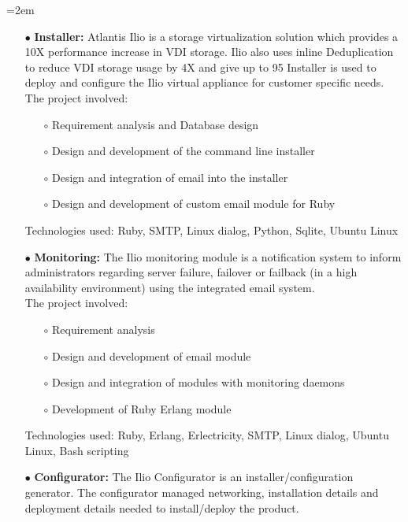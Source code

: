 \documentclass{scrartcl}
\newcommand{\MarginDate}[1]{\marginpar{\raggedleft\itshape\small#1}}
\newcommand{\Description}[1]{\hangindent=2em\hangafter=0\noindent\raggedright\footnotesize{#1}\par\normalsize}
\begin{document}
\begin{cv}{
\href{http://www.develmj.com}{}
}
\Description{
\begin{itemize}
\item[\footnotesize$\bullet$] \textbf{Installer: } \MarginDate{Atlantis Ilio}Atlantis Ilio is a storage virtualization solution which provides a
  10X performance increase in VDI storage. Ilio also uses inline Deduplication
  to reduce VDI storage usage by 4X and give up to 95%
  Installer is used to deploy and configure the Ilio virtual appliance for
  customer specific needs.\\
  The project involved:
{\scriptsize
  \begin{itemize}
  \item[\footnotesize$\circ$] Requirement analysis and Database design
  \item[\footnotesize$\circ$] Design and development of the command line installer
  \item[\footnotesize$\circ$] Design and integration of email into the installer
  \item[\footnotesize$\circ$] Design and development of custom email
    module for Ruby
  \end{itemize}}
  Technologies used: Ruby, SMTP, Linux dialog, Python, Sqlite, Ubuntu Linux
\item[\footnotesize$\bullet$] \textbf{Monitoring: } The Ilio monitoring module is a notification system to inform
administrators regarding server failure, failover or failback (in a high
availability environment) using the integrated email system.\\
The project involved:
{\scriptsize
  \begin{itemize}
  \item[\footnotesize$\circ$] Requirement analysis
  \item[\footnotesize$\circ$] Design and development of email module
  \item[\footnotesize$\circ$] Design and integration of modules with monitoring daemons
  \item[\footnotesize$\circ$] Development of Ruby Erlang module
  \end{itemize}}
  Technologies used: Ruby, Erlang, Erlectricity, SMTP, Linux dialog, Ubuntu
  Linux, Bash scripting
\item[\footnotesize$\bullet$] \textbf{Configurator: } The Ilio Configurator is an installer/configuration generator.
    The configurator managed networking, installation details and deployment
    details needed to install/deploy the product.\\

\end{itemize}}
\end{cv}
\end{document}
